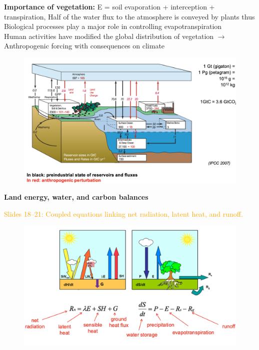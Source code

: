 \documentclass[fontsize=8pt, a4paper, landscape, fleqn]{scrartcl}
\renewcommand{\subsection}[1]{%
    \noindent\colorbox{subsectioncolor}{%
        \parbox{\dimexpr\columnwidth-2\fboxsep}{\color{white}\textbf{#1}}}%
    \vspace{0.5mm}%
}
\begin{document}
\begin{multicols*}{3}[\raggedcolumns]
\textbf{Importance of vegetation:} E = soil evaporation + interception + transpiration, Half of the water flux to the atmosphere is conveyed by plants thus Biological processes play a major role in controlling evapotranspiration\\
Human activities have  modified the global
distribution of vegetation $\rightarrow$Anthropogenic forcing with consequences on climate 
\begin{figure}[H]
    \centering
    \includegraphics[width=1\linewidth]{CS/img/Global_C02_cycle.png}
\end{figure}

\subsection{Land energy, water, and carbon balances}
\noindent \textcolor{orange}{Slides 18–21: Coupled equations linking net radiation, latent heat, and runoff.}

\begin{figure}[H]
    \centering
    \includegraphics[width=1\linewidth]{CS/img/Energy_water_balance.png}
\end{figure}


\end{multicols*}
\end{document}
